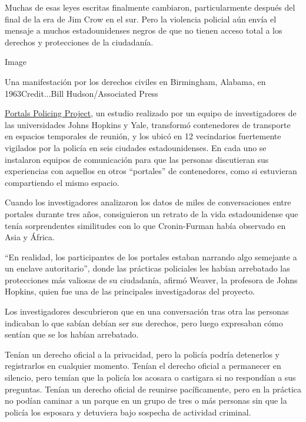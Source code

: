 Muchas de esas leyes escritas finalmente cambiaron, particularmente
después del final de la era de Jim Crow en el sur. Pero la violencia
policial aún envía el mensaje a muchos estadounidenses negros de que no
tienen acceso total a los derechos y protecciones de la ciudadanía.

Image

Una manifestación por los derechos civiles en Birmingham, Alabama, en
1963Credit...Bill Hudson/Associated Press

\href{https://www.portalspolicingproject.com/?campaign_id=30\&emc=edit_int_20200605\&instance_id=19128\&nl=the-interpreter\&regi_id=12757726\&segment_id=30197\&te=1\&user_id=e5a68dc0fda40cd7cd986f21b7d9bdbf}{Portals
Policing Project}, un estudio realizado por un equipo de investigadores
de las universidades Johns Hopkins y Yale, transformó contenedores de
transporte en espacios temporales de reunión, y los ubicó en 12
vecindarios fuertemente vigilados por la policía en seis ciudades
estadounidenses. En cada uno se instalaron equipos de comunicación para
que las personas discutieran sus experiencias con aquellos en otros
``portales'' de contenedores, como si estuvieran compartiendo el mismo
espacio.

Cuando los investigadores analizaron los datos de miles de
conversaciones entre portales durante tres años, consiguieron un retrato
de la vida estadounidense que tenía sorprendentes similitudes con lo que
Cronin-Furman había observado en Asia y África.

``En realidad, los participantes de los portales estaban narrando algo
semejante a un enclave autoritario'', donde las prácticas policiales les
habían arrebatado las protecciones más valiosas de su ciudadanía, afirmó
Weaver, la profesora de Johns Hopkins, quien fue una de las principales
investigadoras del proyecto.

Los investigadores descubrieron que en una conversación tras otra las
personas indicaban lo que sabían debían ser sus derechos, pero luego
expresaban cómo sentían que se los habían arrebatado.

Tenían un derecho oficial a la privacidad, pero la policía podría
detenerlos y registrarlos en cualquier momento. Tenían el derecho
oficial a permanecer en silencio, pero temían que la policía los acosara
o castigara si no respondían a sus preguntas. Tenían un derecho oficial
de reunirse pacíficamente, pero en la práctica no podían caminar a un
parque en un grupo de tres o más personas sin que la policía los
esposara y detuviera bajo sospecha de actividad criminal.

